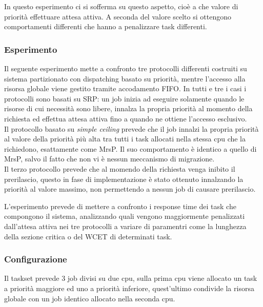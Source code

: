 \noindent In questo esperimento ci si sofferma su questo aspetto, cioè a che valore di priorità effettuare attesa attiva. A seconda del valore scelto si ottengono comportamenti differenti che hanno a penalizzare task differenti.\\

\subsubsection{Esperimento}
\label{sec:confronto_protocolli_exp}

\noindent Il seguente esperimento mette a confronto tre protocolli differenti costruiti su sistema partizionato con dispatching basato su priorità, mentre l'accesso alla risorsa globale viene gestito tramite accodamento FIFO. In tutti e tre i casi i protocolli sono basati su SRP: un job inizia ad eseguire solamente quando le risorse di cui necessità sono libere, innalza la propria priorità al momento della richiesta ed effettua attesa attiva fino a quando ne ottiene l'accesso esclusivo.\\

\noindent Il protocollo basato su \textit{simple ceiling} prevede che il job innalzi la propria priorità al valore della priorità più alta tra tutti i task allocati nella stessa cpu che la richiedono, esattamente come MrsP. Il suo comportamento è identico a quello di MrsP, salvo il fatto che non vi è nessun meccanismo di migrazione.\\

\noindent Il terzo protocollo prevede che al momendo della richiesta venga inibito il prerilascio, questo in fase di implementazione è stato ottenuto innalzando la priorità al valore massimo, non permettendo a nessun job di causare prerilascio.

\noindent L'esperimento prevede di mettere a confronto i response time dei task che compongono il sistema, analizzando quali vengono maggiormente penalizzati dall'attesa attiva nei tre protocolli a variare di paramentri come la lunghezza della sezione critica o del WCET di determinati task.\\

\subsubsection{Configurazione}
\label{sec:confronto_protocolli_conf}

\noindent Il taskset prevede 3 job divisi su due cpu, sulla prima cpu viene allocato un task a priorità maggiore ed uno a priorità inferiore, quest'ultimo condivide la risorsa globale con un job identico allocato nella seconda cpu.\\

